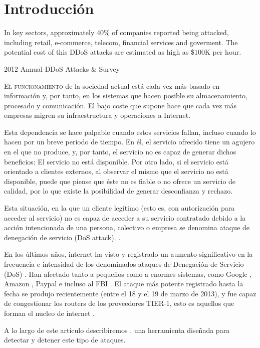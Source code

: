 \chapter{Introducción}\label{introduccion}
\epigraph{In key sectors, approximately 40\% of companies reported being attacked, including retail, 
e-commerce, telecom, financial services and goverment. The potential cost of this DDoS attacks are estimated as 
high as \$100K per hour.}{2012 Annual DDoS Attacks \& Survey}

\lettrine[lraise=-0.1, lines=2, loversize=0.2]{E}{l funcionamiento} de la sociedad actual está cada vez más basado en 
información y, por tanto, en los sistemas que hacen posible su almacenamiento, procesado y comunicación. El bajo coste 
que supone hace que cada vez más empresas migren su infraestructura y operaciones a Internet.

Esta dependencia se hace palpable cuando estos servicios fallan, incluso cuando lo hacen por un breve periodo de tiempo. 
En él, el servicio ofrecido tiene un agujero en el que no produce, y, por tanto, el servicio no es capaz de generar 
dichos beneficios: El servicio no está disponible. Por otro lado, si el servicio está orientado a clientes externos, al 
observar el mismo que el servicio no está disponible, puede que piense que éste no es fiable o no ofrece un servicio 
de calidad, por lo que existe la posibilidad de generar desconfianza y rechazo.

Esta situación, en la que un cliente legítimo (esto es, con autorización para acceder al servicio) no es capaz de 
acceder a su servicio contratado debido a la acción intencionada de una persona, colectivo o empresa se denomina ataque 
de denegación de servicio (DoS attack). \cite{Raghavan}.

En los últimos años, internet ha visto y registrado un aumento significativo en la frecuencia e intensidad de los 
denominados ataques de Denegación de Servicio (DoS) \cite{kakaspersky_2H2011_DDoS_analisis}. Han afectado tanto a 
pequeños como a enormes sistemas, como Google \cite{Google+_DDoS_attack}, Amazon \cite{Amazon_DDoS_attack}, Paypal 
e incluso al FBI \cite{FBI_DDoS_attack}. El ataque más potente registrado hasta la fecha se produjo recientemente (entre 
el 18 y el 19 de marzo de 2013), y fue capaz de congestionar los routers de los proveedores TIER-1, esto es aquellos que 
forman el nucleo de internet \cite{spamhaus_DDoS_attack}. 

A lo largo de este artículo describiremos \redborderddos, una herramienta diseñada 
para detectar y detener este tipo de ataques.


\endinput
